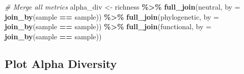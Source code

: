 \documentclass[
]{book}
\newenvironment{Shaded}{\begin{snugshade}}{\end{snugshade}}
\newcommand{\AttributeTok}[1]{\textcolor[rgb]{0.13,0.29,0.53}{#1}}
\newcommand{\CommentTok}[1]{\textcolor[rgb]{0.56,0.35,0.01}{\textit{#1}}}
\newcommand{\FunctionTok}[1]{\textcolor[rgb]{0.13,0.29,0.53}{\textbf{#1}}}
\newcommand{\NormalTok}[1]{#1}
\newcommand{\OtherTok}[1]{\textcolor[rgb]{0.56,0.35,0.01}{#1}}
\newcommand{\SpecialCharTok}[1]{\textcolor[rgb]{0.81,0.36,0.00}{\textbf{#1}}}
\begin{document}
\begin{Shaded}
\begin{Highlighting}[]
\CommentTok{\# Merge all metrics}
\NormalTok{alpha\_div }\OtherTok{\textless{}{-}}\NormalTok{ richness }\SpecialCharTok{\%\textgreater{}\%}
  \FunctionTok{full\_join}\NormalTok{(neutral, }\AttributeTok{by =} \FunctionTok{join\_by}\NormalTok{(sample }\SpecialCharTok{==}\NormalTok{ sample)) }\SpecialCharTok{\%\textgreater{}\%}
  \FunctionTok{full\_join}\NormalTok{(phylogenetic, }\AttributeTok{by =} \FunctionTok{join\_by}\NormalTok{(sample }\SpecialCharTok{==}\NormalTok{ sample)) }\SpecialCharTok{\%\textgreater{}\%}
  \FunctionTok{full\_join}\NormalTok{(functional, }\AttributeTok{by =} \FunctionTok{join\_by}\NormalTok{(sample }\SpecialCharTok{==}\NormalTok{ sample))}
\end{Highlighting}
\end{Shaded}

\subsection{Plot Alpha Diversity}\label{plot-alpha-diversity}
\end{document}
